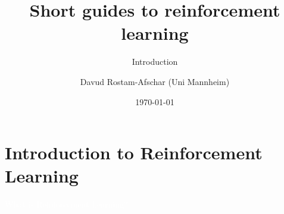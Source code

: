 \documentclass[11pt,table]{beamer}
\title[]{Short guides to reinforcement learning}
\subtitle[]{Introduction}
\author[D. Rostam-Afschar]{\textcolor{gray1}{Davud Rostam-Afschar (Uni Mannheim)}}
\date[]{\today}
\begin{document}
\begin{frame}[plain]
  \titlepage
\end{frame}


\section{Introduction to Reinforcement Learning}
{
\begin{frame}
\centering
\Huge
\textcolor{white}{What is Reinforcement Learning?}
\thispagestyle{empty}
\end{frame}
}
\end{document}
